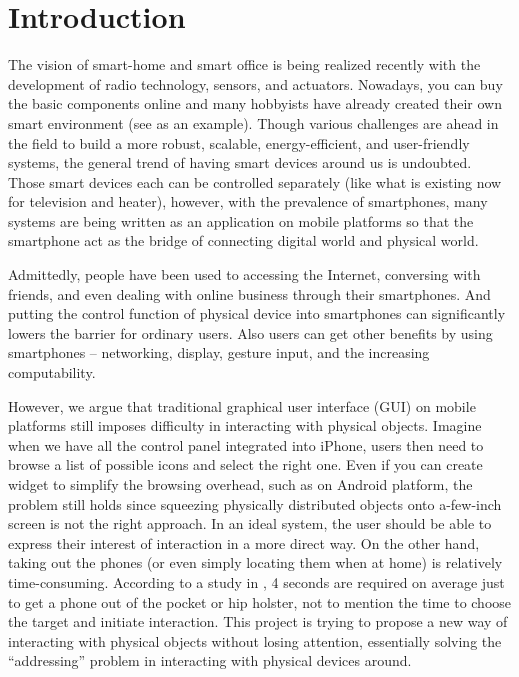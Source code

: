 \section{Introduction}
\label{sec:introduction}

The vision of smart-home and smart office is being realized recently with the development of radio technology, sensors, and actuators. Nowadays, you can buy the basic components online \cite{SmartHome, NinjaBlocks} and many hobbyists have already created their own smart environment (see \cite{BRAD} as an example). Though various challenges are ahead in the field to build a more robust, scalable, energy-efficient, and user-friendly systems, the general trend of having smart devices around us is undoubted. Those smart devices each can be controlled separately (like what is existing now for television and heater), however, with the prevalence of smartphones, many systems \cite{SmartThings, Lockitron} are being written as an application on mobile platforms so that the smartphone act as the bridge of connecting digital world and physical world.

Admittedly, people have been used to accessing the Internet, conversing with friends, and even dealing with online business through their smartphones. And putting the control function of physical device into smartphones can significantly lowers the barrier for ordinary users. Also users can get other benefits by using smartphones -- networking,  display, gesture input, and the increasing computability. 

However, we argue that traditional graphical user interface (GUI) on mobile platforms still imposes difficulty in interacting with physical objects. Imagine when we have all the control panel integrated into iPhone, users then need to browse a list of possible icons and select the right one. Even if you can create widget to simplify the browsing overhead, such as on Android platform, the problem still holds since squeezing physically distributed objects onto a-few-inch screen is not the right approach. In an ideal system, the user should be able to express their interest of interaction in a more direct way. On the other hand, taking out the phones (or even simply locating them when at home) is relatively time-consuming. According to a study in \cite{Ashbrook:2008:QIM:1357054.1357092}, 4 seconds are required on average just to get a phone out of the pocket or hip holster, not to mention the time to choose the target and initiate interaction. This project is trying to propose a new way of interacting with physical objects without losing attention, essentially solving the ``addressing'' problem in interacting with physical devices around.

